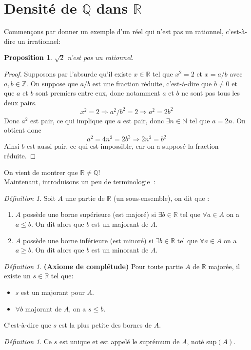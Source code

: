 \documentclass[oneside,12pt,french,table]{book}
\theoremstyle{definition}
\theoremstyle{plain}
\newtheorem{proposition}[definition]{Proposition}
\theoremstyle{remark}
\newtheorem{defi}[definition]{Définition}
\newcommand{\Nn}{{\mathbb{N}}}
\newcommand{\Zz}{{\mathbb{Z}}}
\newcommand{\Rr}{{\mathbb{R}}}
\newcommand{\Qq}{{\mathbb{Q}}}
\begin{document}
\section{Densité de $\Qq$ dans $\Rr$}
Commençons par donner un exemple d'un réel qui n'est pas un rationnel, c'est-à-dire un irrationnel: 
\begin{proposition}
    $\sqrt{2}$ n'est pas un rationnel. 
\end{proposition}
\begin{proof}
   Supposons par l'absurde qu'il existe $x\in \Rr$ tel que $x^2=2$ et $x=a/b$ avec $a,b \in \Zz$. On suppose que $a/b$ est une fraction réduite, c'est-à-dire que $b\neq 0$ et que $a$ et $b$ sont premiers entre eux, donc notamment $a$ et $b$ ne sont pas tous les deux pairs. 
   $$x^2=2 \Rightarrow a^2/b^2=2 \Rightarrow a^2=2b^2$$
   Donc $a^2$ est pair, ce qui implique que $a$ est pair, donc $\exists n \in \Nn$ tel que $a=2n$. On obtient donc $$a^2=4n^2=2b^2 \Rightarrow 2n^2=b^2$$
   Ainsi $b$ est aussi pair, ce qui est impossible, car on a supposé la fraction réduite. 
\end{proof}
On vient de montrer que $\Rr \neq \Qq$!\\
Maintenant, introduisons un peu de terminologie : 
\begin{defi}
    Soit $A$ une partie de $\Rr$ (un sous-ensemble), on dit que : 
    \begin{enumerate}
        \item $A$ possède une borne supérieure (est majoré) si $\exists b \in \Rr $ tel que $\forall a \in A$ on a $a\leq b$. On dit alors que $b$ est un majorant de $A$. 
        \item $A$ possède une borne inférieure (est minoré) si $\exists b \in \Rr $ tel que $\forall a \in A$ on a $a\geq b$. On dit alors que $b$ est un minorant de $A$. 
    \end{enumerate}   
\end{defi}
\begin{defi}
    
\textbf{(Axiome de complétude)}  Pour toute partie $A$ de $\Rr$ majorée, il existe un $s\in \Rr$ tel que: 
\begin{itemize}
    \item $s$ est un majorant pour $A$.
    \item $\forall b$ majorant de $A$, on a $s\leq b$.
\end{itemize}
C'est-à-dire que $s$ est la plus petite des bornes de $A$.
\end{defi}
\begin{defi}
    Ce $s$ est unique et est appelé le suprémum de $A$, noté sup$(A)$.  
\end{defi}
\end{document}
